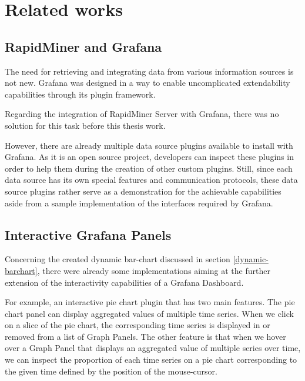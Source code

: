 \chapter{Related works}

%
%
%


\section{RapidMiner and Grafana}

The need for retrieving and integrating data from various information sources is not new. Grafana was designed in a way to enable uncomplicated extendability capabilities through its plugin framework.



Regarding the integration of RapidMiner Server with Grafana, there was no solution for this task before this thesis work.

However, there are already multiple data source plugins available to install with Grafana. As it is an open source project, developers can inspect these plugins in order to help them during the creation of other custom plugins. Still, since each data source has its own special features and communication protocols, these data source plugins rather serve as a demonstration for the achievable capabilities aside from a sample implementation of the interfaces required by Grafana.

\section{Interactive Grafana Panels}
%

Concerning the created dynamic bar-chart discussed in section \ref{dynamic-barchart}, there were already some implementations aiming at the further extension of the interactivity capabilities of a Grafana Dashboard.

For example, an interactive pie chart plugin that has two main features. The pie chart panel can display aggregated values of multiple time series. When we click on a slice of the pie chart, the corresponding time series is displayed in or removed from a list of Graph Panels. The other feature is that when we hover over a Graph Panel that displays an aggregated value of multiple series over time, we can inspect the proportion of each time series on a pie chart corresponding to the given time defined by the position of the mouse-cursor.


